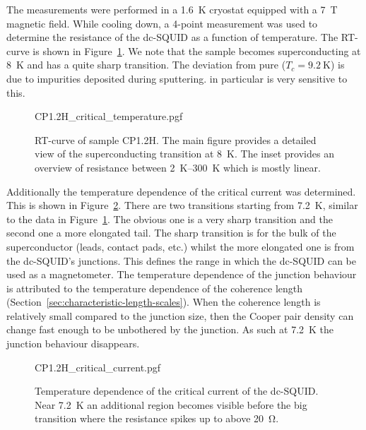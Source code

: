The measurements were performed in a \qty{1.6}{\kelvin} cryostat equipped with a \qty{7}{\tesla} magnetic field. While cooling down, a 4-point measurement was used to determine the resistance of the dc-SQUID as a function of temperature. The RT-curve is shown in Figure~\ref{fig:CP1.2H-SQUID-RT}. We note that the sample becomes superconducting at \qty{8}{\kelvin} and has a quite sharp transition. The deviation from pure  ($T_c=\qty{9.2}{\kelvin}$\cite{maxfieldSuperconductingPenetrationDepth1965}) is due to impurities deposited during sputtering.  in particular is very sensitive to this.

\begin{figure}[ht!]
	\centering
	{CP1.2H_critical_temperature.pgf}
	\caption{
		RT-curve of sample CP1.2H. The main figure provides a detailed view of the superconducting transition at \qty{8}{\kelvin}. The inset provides an overview of resistance between \qtyrange{2}{300}{\kelvin} which is mostly linear.
	}
	\label{fig:CP1.2H-SQUID-RT}
\end{figure}

Additionally the temperature dependence of the critical current was determined. This is shown in Figure~\ref{fig:CP1.2H-SQUID-critical-current-temperature-dependence}. There are two transitions starting from \qty{7.2}{\kelvin}, similar to the data in Figure~\ref{fig:CP1.2H-SQUID-RT}. The obvious one is a very sharp transition and the second one a more elongated tail. The sharp transition is for the bulk of the superconductor (leads, contact pads, etc.) whilst the more elongated one is from the dc-SQUID's junctions. This defines the range in which the dc-SQUID can be used as a magnetometer. The temperature dependence of the junction behaviour is attributed to the temperature dependence of the coherence length (Section~\ref{sec:characteristic-length-scales}). When the coherence length is relatively small compared to the junction size, then the Cooper pair density can change fast enough to be unbothered by the junction. As such at \qty{7.2}{\kelvin} the junction behaviour disappears. 

\begin{figure}[ht!]
	\centering
	{CP1.2H_critical_current.pgf}
	\caption{Temperature dependence of the critical current of the dc-SQUID. Near \qty{7.2}{\kelvin} an additional region becomes visible before the big transition where the resistance spikes up to above \qty{20}{\ohm}.}
	\label{fig:CP1.2H-SQUID-critical-current-temperature-dependence}
\end{figure}

